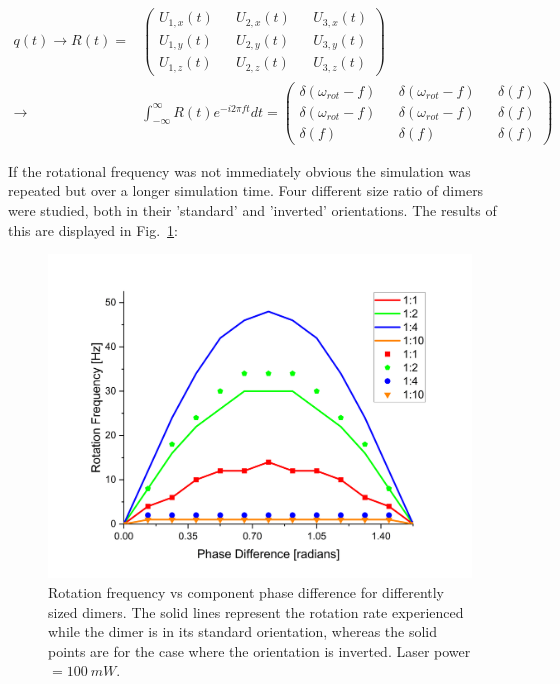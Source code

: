 \begin{equation}
\begin{split}
	q(t) \rightarrow R(t) =& 
	\begin{pmatrix}
		U_{1,x}(t) && U_{2,x}(t) && U_{3,x}(t) \\
		U_{1,y}(t) && U_{2,y}(t) && U_{3,y}(t) \\
		U_{1,z}(t) && U_{2,z}(t) && U_{3,z}(t) 
	\end{pmatrix} \\
	\rightarrow
	&\int^\infty_{-\infty}R(t)e^{-i2\pi ft} dt = 
	\begin{pmatrix}
		\delta(\omega_{rot}-f) && \delta(\omega_{rot}-f) && \delta(f) \\
		\delta(\omega_{rot}-f) && \delta(\omega_{rot}-f) && \delta(f)\\
		\delta(f) && \delta(f) && \delta(f)
	\end{pmatrix}
\end{split}
\end{equation}

If the rotational frequency was not immediately obvious the simulation was
repeated but over a longer simulation time. Four different size ratio of 
dimers were studied, both in their 'standard' and 'inverted' orientations. 
The results of this are displayed in Fig.~\ref{fig:rotation_vs_pol}:
\begin{figure}[h!]
	\centering
	\includegraphics[width=\linewidth]{rotation_vs_pol.png}
	\caption{Rotation frequency vs component phase difference for differently 
		sized dimers. The solid lines represent the rotation rate experienced 
		while the dimer is in its standard orientation, whereas the solid points 
		are for the case where the orientation is inverted. Laser power $= 100\ mW$.}
	\label{fig:rotation_vs_pol}
\end{figure}

